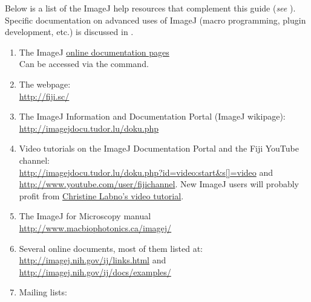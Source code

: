 Below is a list of the ImageJ help resources
that complement this guide (\emph{see} ).
Specific documentation on advanced uses of ImageJ (macro programming,
plugin development, etc.) is discussed in .
\begin{enumerate}
\item The ImageJ \href{http://imagej.nih.gov/ij/docs/}{online documentation pages}\\
Can be accessed via the \textsf{}
command.
\item The  webpage:\\
\url{http://fiji.sc/}
\item The ImageJ Information and Documentation Portal (ImageJ wikipage):\\
\href{http://imagejdocu.tudor.lu/doku.php}{http://imagejdocu.tudor.lu/doku.php}
\item Video tutorials on the ImageJ Documentation Portal
and the Fiji YouTube channel:\\
\url{http://imagejdocu.tudor.lu/doku.php?id=video:start&s[]=video}
and \url{http://www.youtube.com/user/fijichannel}. New ImageJ users
will probably profit from \href{http://imagejdocu.tudor.lu/doku.php?id=video:beginner_help:imagej_beginner_s_tutorial}{Christine Labno's video tutorial}.
\item The ImageJ for Microscopy manual\\
\url{http://www.macbiophotonics.ca/imagej/}
\item Several online documents, most of them listed at:\\
\url{http://imagej.nih.gov/ij/links.html} and \url{http://imagej.nih.gov/ij/docs/examples/}
\item Mailing lists:


\end{enumerate}
